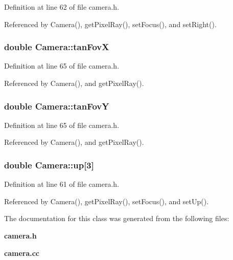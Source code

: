 Definition at line 62 of file camera.\+h.



Referenced by Camera(), get\+Pixel\+Ray(), set\+Focus(), and set\+Right().

\subsubsection[{tan\+Fov\+X}]{\setlength{\rightskip}{0pt plus 5cm}double Camera\+::tan\+Fov\+X\hspace{0.3cm}{\ttfamily [private]}}\label{class_camera_a6cca78cef9affdbecab440df3f751776}


Definition at line 65 of file camera.\+h.



Referenced by Camera(), and get\+Pixel\+Ray().

\subsubsection[{tan\+Fov\+Y}]{\setlength{\rightskip}{0pt plus 5cm}double Camera\+::tan\+Fov\+Y\hspace{0.3cm}{\ttfamily [private]}}\label{class_camera_a269f0793e78f88f54c8b31aacb1be3f5}


Definition at line 65 of file camera.\+h.



Referenced by Camera(), and get\+Pixel\+Ray().

\subsubsection[{up}]{\setlength{\rightskip}{0pt plus 5cm}double Camera\+::up[3]\hspace{0.3cm}{\ttfamily [private]}}\label{class_camera_af6d50d50de039113a852a12b4e752cdc}


Definition at line 61 of file camera.\+h.



Referenced by Camera(), get\+Pixel\+Ray(), set\+Focus(), and set\+Up().



The documentation for this class was generated from the following files\+:\begin{DoxyCompactItemize}
\item 
{\bf camera.\+h}\item 
{\bf camera.\+cc}\end{DoxyCompactItemize}
